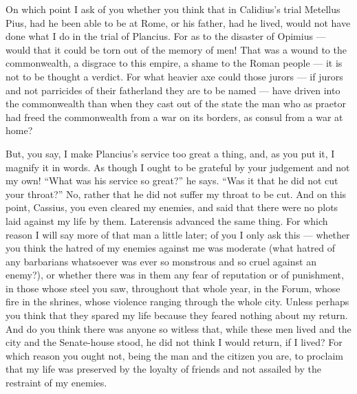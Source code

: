  On which point I ask of you whether you think that in Calidius's trial Metellus Pius, had he been able to be at Rome, or his father, had he lived, would not have done what I do in the trial of Plancius. For as to the disaster of Opimius --- would that it could be torn out of the memory of men! That was a wound to the commonwealth, a disgrace to this empire, a shame to the Roman people --- it is not to be thought a verdict. For what heavier axe could those jurors --- if jurors and not parricides of their fatherland they are to be named --- have driven into the commonwealth than when they cast out of the state the man who as praetor had freed the commonwealth from a war on its borders, as consul from a war at home?

 But, you say, I make Plancius's service too great a thing, and, as you put it, I magnify it in words. As though I ought to be grateful by your judgement and not my own! ``What was his service so great?'' he says. ``Was it that he did not cut your throat?'' No, rather that he did not suffer my throat to be cut. And on this point, Cassius, you even cleared my enemies, and said that there were no plots laid against my life by them. Laterensis advanced the same thing. For which reason I will say more of that man a little later; of you I only ask this --- whether you think the hatred of my enemies against me was moderate (what hatred of any barbarians whatsoever was ever so monstrous and so cruel against an enemy?), or whether there was in them any fear of reputation or of punishment, in those whose steel you saw, throughout that whole year, in the Forum, whose fire in the shrines, whose violence ranging through the whole city. Unless perhaps you think that they spared my life because they feared nothing about my return. And do you think there was anyone so witless that, while these men lived and the city and the Senate-house stood, he did not think I would return, if I lived? For which reason you ought not, being the man and the citizen you are, to proclaim that my life was preserved by the loyalty of friends and not assailed by the restraint of my enemies.

